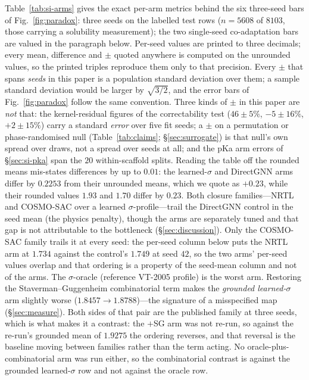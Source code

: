 Table~\ref{tab:si-arms} gives the exact per-arm metrics behind the six three-seed bars of
Fig.~\ref{fig:paradox}: three seeds on the labelled test rows
($n{=}5608$ of $8103$, those carrying a solubility measurement); the two single-seed co-adaptation bars are
valued in the paragraph below. Per-seed values are printed to three decimals;
every mean, difference and $\pm$ quoted anywhere is computed on the unrounded values, so the printed
triples reproduce them only to that precision. Every $\pm$ that spans \emph{seeds} in this paper is a
population standard deviation over them; a sample standard deviation
would be larger by $\sqrt{3/2}$, and the error bars of Fig.~\ref{fig:paradox}
follow the same convention. Three kinds of $\pm$ in this paper are \emph{not} that:
the kernel-residual figures of the correctability test
($46\pm5\%$, $-5\pm16\%$, $+2\pm15\%$) carry a standard \emph{error} over five fit seeds; a $\pm$ on a
permutation or phase-randomised null (Table~\ref{tab:claims}; \S\ref{sec:surrogate}) is that null's
own spread over draws, not a spread over seeds at all; and the pKa arm errors of
\S\ref{sec:si-pka} span the $20$ within-scaffold splits. Reading the table off the rounded means mis-states differences by up to
$0.01$: the learned-$\sigma$ and DirectGNN arms differ by $0.2253$ from their unrounded means, which
we quote as $+0.23$, while their rounded values $1.93$ and $1.70$ differ by $0.23$. Both closure
families---NRTL and COSMO-SAC over a learned $\sigma$-profile---trail the DirectGNN control in the
seed mean (the physics penalty), though the arms are separately tuned and that gap is not
attributable to the bottleneck (\S\ref{sec:discussion}). Only the COSMO-SAC family trails it at every
seed: the per-seed column below puts the NRTL arm at $1.734$ against the control's $1.749$ at seed
$42$, so the two arms' per-seed values overlap and that ordering is a property of the seed-mean
column and not of the arms. The $\sigma$-oracle (reference VT-2005 profile) is the worst arm.
Restoring the Staverman--Guggenheim combinatorial term makes the \emph{grounded learned-$\sigma$} arm
slightly worse ($1.8457\to1.8788$)---the signature of a misspecified map (\S\ref{sec:measure}).
Both sides of that pair are the published family at three seeds, which is what makes it a contrast:
the $+$SG arm was not re-run, so against the re-run's grounded mean of $1.9275$ the ordering
reverses, and that reversal is the baseline moving between families rather than the term acting. No
oracle-plus-combinatorial arm was run either, so the combinatorial contrast is against the grounded
learned-$\sigma$ row and not against the oracle row.


